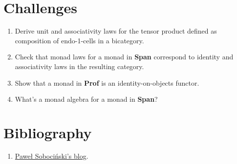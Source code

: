 \section{Challenges}\label{challenges}

\begin{enumerate}
\tightlist
\item
  Derive unit and associativity laws for the tensor product defined as
  composition of endo-1-cells in a bicategory.
\item
  Check that monad laws for a monad in \textbf{Span} correspond to
  identity and associativity laws in the resulting category.
\item
  Show that a monad in \textbf{Prof} is an identity-on-objects functor.
\item
  What's a monad algebra for a monad in \textbf{Span}?
\end{enumerate}

\section{Bibliography}\label{bibliography}
\begin{enumerate}
  \tightlist
  \item
  \href{https://graphicallinearalgebra.net/2017/04/16/a-monoid-is-a-category-a-category-is-a-monad-a-monad-is-a-monoid/}{Paweł Sobociński’s blog}.
\end{enumerate}